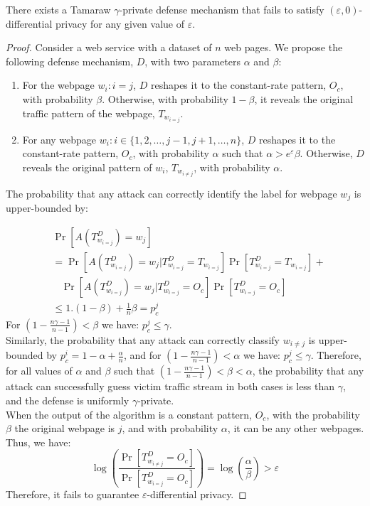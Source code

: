 \begin{lemma-numbered}
  There exists a Tamaraw $\gamma$-private defense mechanism that fails to satisfy $(\varepsilon, 0)$-differential privacy for any given value of $\varepsilon$.
\end{lemma-numbered}
\begin{proof}
    Consider a web service with a dataset of $n$ web pages.
    We propose the following defense mechanism, $D$, with two parameters $\alpha$ and $\beta$:
    \begin{enumerate}
    \item For the webpage $w_i: i=j$, $D$ reshapes it to the constant-rate pattern, $O_c$, with probability $\beta$. Otherwise, with probability $1-\beta$, it reveals the original traffic pattern of the webpage, $T_{w_{i=j}}$.
    \item For any webpage $w_i: i \in \{1, 2, \dots, j-1, j+1, \dots, n\}$, $D$ reshapes it to the constant-rate pattern, $O_c$, with probability $\alpha$ such that $\alpha > {e^{\varepsilon}}\beta$. Otherwise, $D$ reveals the original pattern of $w_i$, $T_{w_{i\neq j}}$, with probability $\alpha$.
    \end{enumerate}
    The probability that any attack can correctly identify the label for webpage $w_j$ is upper-bounded by:

    \begin{align*}
      & \Pr[A(T^{D}_{w_{i=j}}) = w_j]
      \\
      & = \Pr[A(T^D_{w_{i=j}}) = w_j | T^D_{w_{i=j}}=T_{w_{i=j}}]\Pr[T^D_{w_{i=j}}=T_{w_{i=j}}] +
      \\
      &~~~~\Pr[A(T^D_{w_{i=j}}) = w_j | T^D_{w_{i=j}}=O_c]\Pr[T^D_{w_{i=j}}=O_c]
      \\
      & \leq  1.(1-\beta) + \frac{1}{n}\beta = p_c^j
    \end{align*}
    For $(1- \frac{n\gamma - 1}{n-1}) < \beta$ we have: $p_c^j \leq \gamma$.
    \\
    Similarly, the probability that any attack can correctly classify $w_{i\neq j}$ is upper-bounded by $p_c^i = 1-\alpha + \frac{\alpha}{n}$, and for $(1- \frac{n\gamma - 1}{n-1}) < \alpha$ we have: $p_c^j \leq \gamma$.
    Therefore, for all values of $\alpha$ and $\beta$ such that $(1- \frac{n\gamma -
    1}{n-1}) < \beta < \alpha$, the probability that any attack can successfully
    guess victim traffic stream in both cases is less than $\gamma$, and
    the defense is uniformly $\gamma$-private.
    \\
    When the output of the algorithm is a constant pattern, $O_{c}$, with the probability $\beta$ the original webpage is $j$, and with probability $\alpha$, it can be any other webpages. Thus, we have:
    \begin{equation*}
    \log(\frac{\Pr[T_{w_{i\neq j}}^{D}=O_{c}]}{\Pr[T_{w_{i=j}}^{D}=O_{c}]})
    = \log(\frac{\alpha}{\beta}) > \varepsilon
    \end{equation*}
  Therefore, it fails to guarantee $\varepsilon$-differential privacy.
\end{proof}


